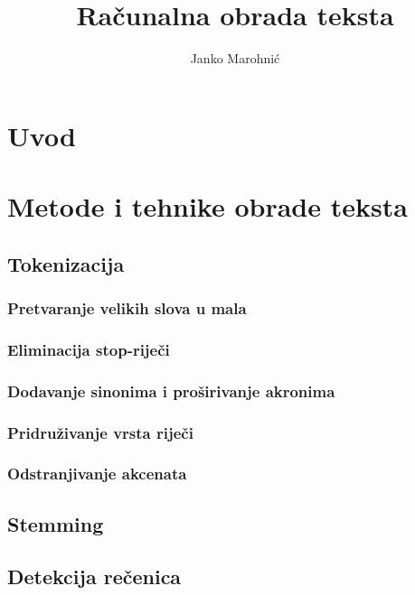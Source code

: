 \documentclass[11pt]{scrreprt}
\title{Računalna obrada teksta}
\author{Janko Marohnić}
\begin{document}
\maketitle


\tableofcontents

\pagebreak


\chapter{Uvod}

\chapter{Metode i tehnike obrade teksta}

\section{Tokenizacija}

\subsection{Pretvaranje velikih slova u mala}

\subsection{Eliminacija stop-riječi}

\subsection{Dodavanje sinonima i proširivanje akronima}

\subsection{Pridruživanje vrsta riječi}

\subsection{Odstranjivanje akcenata}

\section{Stemming}

\section{Detekcija rečenica}
\end{document}

